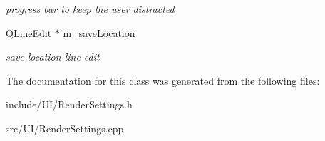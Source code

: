 \begin{DoxyCompactItemize}
\begin{DoxyCompactList}\small\item\em progress bar to keep the user distracted \end{DoxyCompactList}\item 
\hypertarget{class_render_settings_a69bb8bc7254b1d700831f05061504e95}{Q\-Line\-Edit $\ast$ \hyperlink{class_render_settings_a69bb8bc7254b1d700831f05061504e95}{m\-\_\-save\-Location}}\label{class_render_settings_a69bb8bc7254b1d700831f05061504e95}

\begin{DoxyCompactList}\small\item\em save location line edit \end{DoxyCompactList}\end{DoxyCompactItemize}


The documentation for this class was generated from the following files\-:\begin{DoxyCompactItemize}
\item 
include/\-U\-I/Render\-Settings.\-h\item 
src/\-U\-I/Render\-Settings.\-cpp\end{DoxyCompactItemize}
